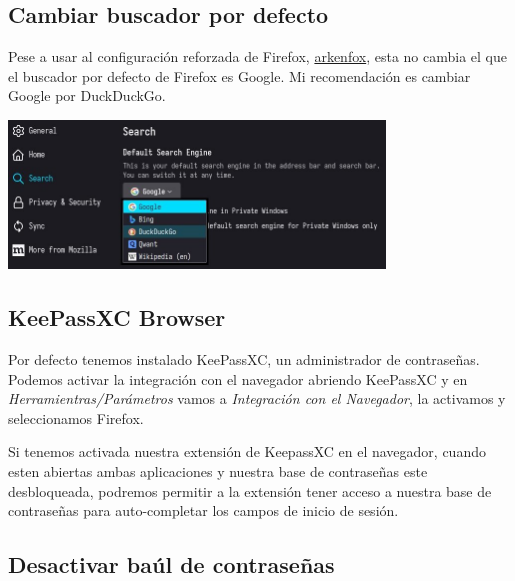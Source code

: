 \documentclass[12pt]{article}
\begin{document}
\subsection{Cambiar buscador por defecto}

Pese a usar al configuración reforzada de Firefox, \href{https://github.com/arkenfox/user.js}{arkenfox}, esta no cambia el que el buscador por defecto de Firefox es Google. Mi recomendación es cambiar Google por DuckDuckGo.

\begin{center}
	\includegraphics[width=0.75\textwidth]{images/search-engine.jpg}
\end{center}

\subsection{KeePassXC Browser}

Por defecto tenemos instalado KeePassXC, un administrador de contraseñas. Podemos activar la integración con el navegador abriendo KeePassXC y en \emph{Herramientras/Parámetros} vamos a \emph{Integración con el Navegador}, la activamos y seleccionamos Firefox.

Si tenemos activada nuestra extensión de KeepassXC en el navegador, cuando esten abiertas ambas aplicaciones y nuestra base de contraseñas este desbloqueada, podremos permitir a la extensión tener acceso a nuestra base de contraseñas para auto-completar los campos de inicio de sesión.

\subsection{Desactivar baúl de contraseñas}
\end{document}
